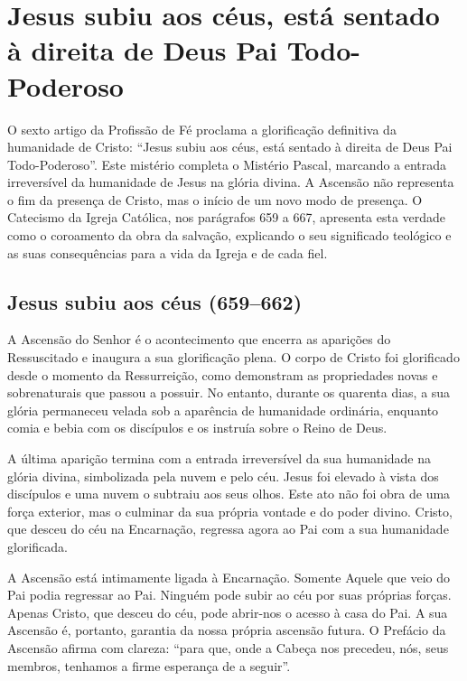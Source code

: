 \chapter{Jesus subiu aos céus, está sentado à direita de Deus Pai Todo-Poderoso}

O sexto artigo da Profissão de Fé proclama a glorificação definitiva da humanidade de Cristo: ``Jesus subiu aos céus, está sentado à direita de Deus Pai Todo-Poderoso''. Este mistério completa o Mistério Pascal, marcando a entrada irreversível da humanidade de Jesus na glória divina. A Ascensão não representa o fim da presença de Cristo, mas o início de um novo modo de presença. O Catecismo da Igreja Católica, nos parágrafos 659 a 667, apresenta esta verdade como o coroamento da obra da salvação, explicando o seu significado teológico e as suas consequências para a vida da Igreja e de cada fiel.

\section{Jesus subiu aos céus (659--662)}

A Ascensão do Senhor é o acontecimento que encerra as aparições do Ressuscitado e inaugura a sua glorificação plena. O corpo de Cristo foi glorificado desde o momento da Ressurreição, como demonstram as propriedades novas e sobrenaturais que passou a possuir. No entanto, durante os quarenta dias, a sua glória permaneceu velada sob a aparência de humanidade ordinária, enquanto comia e bebia com os discípulos e os instruía sobre o Reino de Deus.

A última aparição termina com a entrada irreversível da sua humanidade na glória divina, simbolizada pela nuvem e pelo céu. Jesus foi elevado à vista dos discípulos e uma nuvem o subtraiu aos seus olhos. Este ato não foi obra de uma força exterior, mas o culminar da sua própria vontade e do poder divino. Cristo, que desceu do céu na Encarnação, regressa agora ao Pai com a sua humanidade glorificada.

A Ascensão está intimamente ligada à Encarnação. Somente Aquele que veio do Pai podia regressar ao Pai. Ninguém pode subir ao céu por suas próprias forças. Apenas Cristo, que desceu do céu, pode abrir-nos o acesso à casa do Pai. A sua Ascensão é, portanto, garantia da nossa própria ascensão futura. O Prefácio da Ascensão afirma com clareza: ``para que, onde a Cabeça nos precedeu, nós, seus membros, tenhamos a firme esperança de a seguir''.

